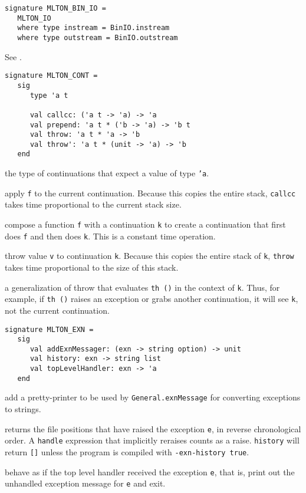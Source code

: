 \begin{verbatim}
signature MLTON_BIN_IO =
   MLTON_IO
   where type instream = BinIO.instream
   where type outstream = BinIO.outstream
\end{verbatim}

See .


\begin{verbatim}
signature MLTON_CONT =
   sig
      type 'a t

      val callcc: ('a t -> 'a) -> 'a
      val prepend: 'a t * ('b -> 'a) -> 'b t
      val throw: 'a t * 'a -> 'b
      val throw': 'a t * (unit -> 'a) -> 'b
   end
\end{verbatim}

\begin{description}

the type of continuations that expect a value of type {\tt 'a}.

apply {\tt f} to the current continuation.  Because this copies the
entire stack, {\tt callcc} takes time proportional to the current
stack size.

compose a function {\tt f} with a continuation {\tt k} to create a
continuation that first does {\tt f} and then does {\tt k}.  This
is a constant time operation.

throw value {\tt v} to continuation {\tt k}.  Because this copies the
entire stack of {\tt k}, {\tt throw} takes time proportional to the
size of this stack.

a generalization of throw that evaluates {\tt th ()} in the context
of {\tt k}.  Thus, for example, if {\tt th ()} raises an exception or
grabs another continuation, it will see {\tt k}, not the current
continuation.

\end{description}


\begin{verbatim}
signature MLTON_EXN =
   sig
      val addExnMessager: (exn -> string option) -> unit
      val history: exn -> string list
      val topLevelHandler: exn -> 'a
   end
\end{verbatim}

\begin{description}

add a pretty-printer to be used by {\tt General.exnMessage} for
converting exceptions to strings.

returns the file positions that have raised the exception {\tt e}, in reverse
chronological order.   A {\tt handle} expression that implicitly reraises counts
as a raise.  {\tt history} will return {\tt []} unless the program is compiled
with {\tt -exn-history true}.

behave as if the top level handler received the exception {\tt e},
that is, print out the unhandled exception message for {\tt e} and
exit.

\end{description}


